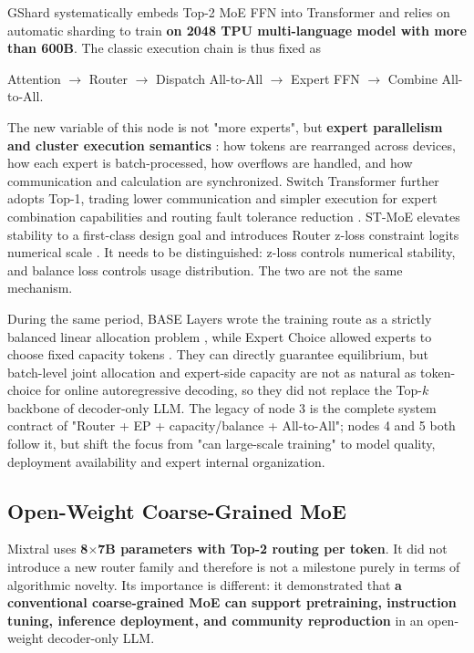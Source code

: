 \documentclass[10pt,a4paper,fontset=none]{ctexart}
\newcommand{\term}[1]{\textbf{#1}}
\begin{document}
GShard systematically embeds Top-2 MoE FFN into Transformer and relies on automatic sharding to train \textbf{ on \textbf{2048 TPU} multi-language model \cite{lepikhin2020gshard} with more than 600B}. The classic execution chain is thus fixed as
\begin{center}
\textsf{Attention $\rightarrow$ Router $\rightarrow$ Dispatch All-to-All $\rightarrow$ Expert FFN $\rightarrow$ Combine All-to-All}.
\end{center}
The new variable of this node is not "more experts", but \term{expert parallelism and cluster execution semantics }: how tokens are rearranged across devices, how each expert is batch-processed, how overflows are handled, and how communication and calculation are synchronized. Switch Transformer further adopts Top-1, trading lower communication and simpler execution for expert combination capabilities and routing fault tolerance reduction \cite{fedus2021switch}. ST-MoE elevates stability to a first-class design goal and introduces Router z-loss constraint logits numerical scale \cite{zoph2022stmoe}. It needs to be distinguished: z-loss controls numerical stability, and balance loss controls usage distribution. The two are not the same mechanism.

During the same period, BASE Layers wrote the training route as a strictly balanced linear allocation problem \cite{lewis2021base}, while Expert Choice allowed experts to choose fixed capacity tokens \cite{zhou2022expertchoice}. They can directly guarantee equilibrium, but batch-level joint allocation and expert-side capacity are not as natural as token-choice for online autoregressive decoding, so they did not replace the Top-$k$ backbone of decoder-only LLM. The legacy of node 3 is the complete system contract of "Router + EP + capacity/balance + All-to-All"; nodes 4 and 5 both follow it, but shift the focus from "can large-scale training" to model quality, deployment availability and expert internal organization.

\subsection{Open-Weight Coarse-Grained MoE}

Mixtral uses \textbf{8$\times$7B parameters with Top-2 routing per token}\cite{jiang2024mixtral}. It did not introduce a new router family and therefore is not a milestone purely in terms of algorithmic novelty. Its importance is different: it demonstrated that \term{a conventional coarse-grained MoE can support pretraining, instruction tuning, inference deployment, and community reproduction} in an open-weight decoder-only LLM.
\end{document}

